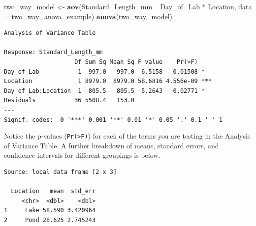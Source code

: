 \documentclass[twoside, 12pt]{article}
\newenvironment{Shaded}{\begin{snugshade}}{\end{snugshade}}
\newcommand{\KeywordTok}[1]{\textcolor[rgb]{0.13,0.29,0.53}{\textbf{{#1}}}}
\newcommand{\DataTypeTok}[1]{\textcolor[rgb]{0.13,0.29,0.53}{{#1}}}
\newcommand{\StringTok}[1]{\textcolor[rgb]{0.31,0.60,0.02}{{#1}}}
\newcommand{\NormalTok}[1]{{#1}}
\begin{document}
\begin{Shaded}
\begin{Highlighting}[]
\NormalTok{two_way_model <-}\StringTok{ }\KeywordTok{aov}\NormalTok{(Standard_Length_mm ~}\StringTok{ }\NormalTok{Day_of_Lab *}\StringTok{ }\NormalTok{Location,}
                    \DataTypeTok{data =} \NormalTok{two_way_anova_example)}
\KeywordTok{anova}\NormalTok{(two_way_model)}
\end{Highlighting}
\end{Shaded}

\begin{Verbatim}[frame=single]
Analysis of Variance Table

Response: Standard_Length_mm
                    Df Sum Sq Mean Sq F value    Pr(>F)    
Day_of_Lab           1  997.0   997.0  6.5158   0.01508 *  
Location             1 8979.0  8979.0 58.6816 4.556e-09 ***
Day_of_Lab:Location  1  805.5   805.5  5.2643   0.02771 *  
Residuals           36 5508.4   153.0                      
---
Signif. codes:  0 '***' 0.001 '**' 0.01 '*' 0.05 '.' 0.1 ' ' 1
\end{Verbatim}

Notice the p-values (\texttt{Pr(\textgreater{}F)}) for each of the terms
you are testing in the Analysis of Variance Table. A further breakdown
of means, standard errors, and confidence intervals for different
groupings is below.

\begin{Shaded}
\end{Shaded}

\begin{Verbatim}[frame=single]
Source: local data frame [2 x 3]

  Location   mean  std_err
     <chr>  <dbl>    <dbl>
1     Lake 58.590 3.420964
2     Pond 28.625 2.745243
\end{Verbatim}
\end{document}
